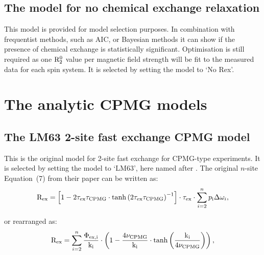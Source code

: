 
\subsection{The model for no chemical exchange relaxation}
\label{sect: dispersion: No Rex model}

This model is provided for model selection purposes.
In combination with frequentist methods, such as AIC, or Bayesian methods it can show if the presence of chemical exchange is statistically significant.
Optimisation is still required as one $\mathrm{R}_2^0$ value per magnetic field strength will be fit to the measured data for each spin system.
It is selected by setting the model to `No Rex'.




\section{The analytic CPMG models}
\label{sect: dispersion: analytic CPMG models}



\subsection{The LM63 2-site fast exchange CPMG model}
\label{sect: dispersion: LM63 model}

This is the original model for 2-site fast exchange for CPMG-type experiments.
It is selected by setting the model to `LM63', here named after \citet{LuzMeiboom63}.
The original $n$-site Equation~(7) from their paper can be written as:
\begin{equation}
    \mathrm{R}_\textrm{ex} = \left[ 1 - 2\tau_\textrm{ex}\tau_\textrm{CPMG} \cdot \tanh \left( 2\tau_\textrm{ex}\tau_\textrm{CPMG} \right)^{-1} \right] \cdot \tau_\textrm{ex} \cdot \sum_{i=2}^n p_\textrm{i}\Delta\omega_{i} ,
\end{equation}

or rearranged as:
\begin{equation} \label{eq: Luz-Meiboom}
    \mathrm{R}_\textrm{ex} = \sum_{i=2}^n \frac{\Phi_\textrm{ex,i}}{\textrm{k}_\textrm{i}} \cdot \left( 1 - \frac{4\nu_\textrm{CPMG}}{\textrm{k}_\textrm{i}} \cdot \tanh \left( \frac{\textrm{k}_\textrm{i}}{4\nu_\textrm{CPMG}} \right) \right) ,
\end{equation}



